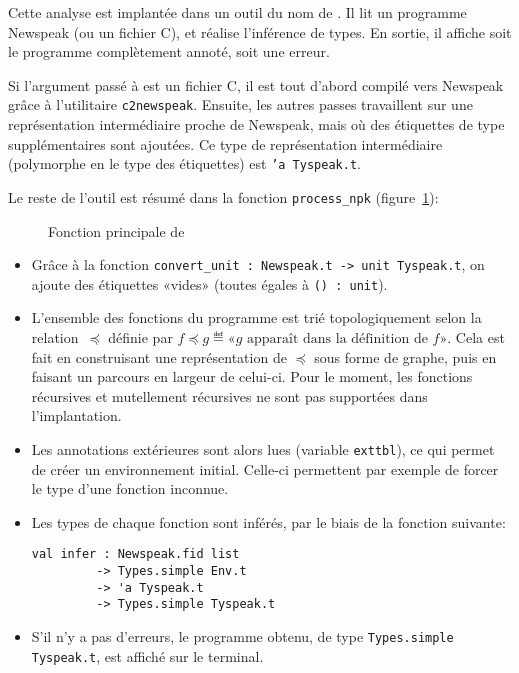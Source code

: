 Cette analyse est implantée dans un outil du nom de \ptrtype{}. Il lit un
programme Newspeak (ou un fichier C), et réalise l'inférence de types. En
sortie, il affiche soit le programme complètement annoté, soit une erreur.

Si l'argument passé à \ptrtype{} est un fichier C, il est tout d'abord compilé
vers Newspeak grâce à l'utilitaire \texttt{c2newspeak}. Ensuite, les autres
passes travaillent sur une représentation intermédiaire proche de Newspeak, mais
où des étiquettes de type supplémentaires sont ajoutées. Ce type de
représentation intermédiaire (polymorphe en le type des étiquettes) est
\texttt{'a Tyspeak.t}.

Le reste de l'outil est résumé dans la fonction
\texttt{process\_npk} (figure~\ref{fig:implem-process}):

\begin{figure}
\caption{Fonction principale de \ptrtype{}}
\label{fig:implem-process}
\end{figure}

\begin{itemize}

\item Grâce à la fonction \verb!convert_unit : Newspeak.t -> unit Tyspeak.t!,
  on ajoute des étiquettes «vides» (toutes égales à \verb!() : unit!).

\item L'ensemble des fonctions du programme est trié topologiquement selon la
  relation~$\preceq$ définie par $f \preceq g \eqdef \textrm{«} g
  \textrm{ apparaît dans la définition de } f \textrm{»}$. Cela est fait en
  construisant une représentation de $\preceq$ sous forme de graphe, puis en
  faisant un parcours en largeur de celui-ci. Pour le moment, les fonctions
  récursives et mutellement récursives ne sont pas supportées dans
  l'implantation.

\item Les annotations extérieures sont alors lues (variable \texttt{exttbl}), ce
  qui permet de créer un environnement initial. Celle-ci permettent par exemple
  de forcer le type d'une fonction inconnue.

\item Les types de chaque fonction sont inférés, par le biais de la fonction
  suivante:

\begin{Verbatim}
val infer : Newspeak.fid list
         -> Types.simple Env.t
         -> 'a Tyspeak.t
         -> Types.simple Tyspeak.t
\end{Verbatim}

\item S'il n'y a pas d'erreurs, le programme obtenu, de type
\texttt{Types.simple Tyspeak.t}, est affiché sur le terminal.

\end{itemize}

